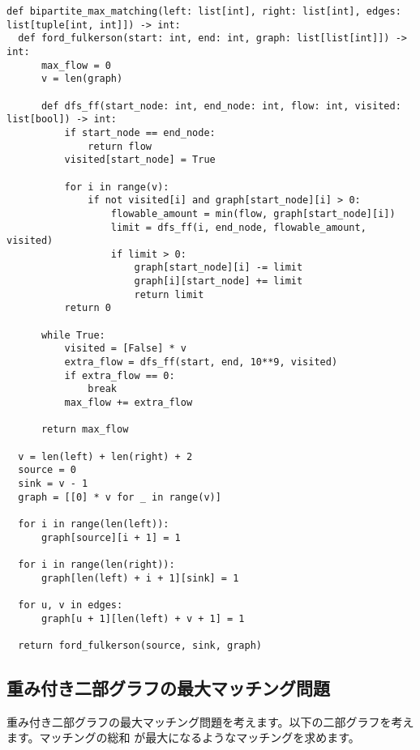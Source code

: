 \documentclass{jlreq}
\begin{document}
\begin{lstlisting}[caption=二部グラフの最大マッチング問題の実装, label=bipartite_matching, frame=TRBL, label={bipartite_matching}]
def bipartite_max_matching(left: list[int], right: list[int], edges: list[tuple[int, int]]) -> int:
  def ford_fulkerson(start: int, end: int, graph: list[list[int]]) -> int:
      max_flow = 0
      v = len(graph)

      def dfs_ff(start_node: int, end_node: int, flow: int, visited: list[bool]) -> int:
          if start_node == end_node:
              return flow
          visited[start_node] = True

          for i in range(v):
              if not visited[i] and graph[start_node][i] > 0:
                  flowable_amount = min(flow, graph[start_node][i])
                  limit = dfs_ff(i, end_node, flowable_amount, visited)
                  if limit > 0:
                      graph[start_node][i] -= limit
                      graph[i][start_node] += limit
                      return limit
          return 0

      while True:
          visited = [False] * v
          extra_flow = dfs_ff(start, end, 10**9, visited)
          if extra_flow == 0:
              break
          max_flow += extra_flow

      return max_flow

  v = len(left) + len(right) + 2  
  source = 0
  sink = v - 1
  graph = [[0] * v for _ in range(v)]

  for i in range(len(left)):
      graph[source][i + 1] = 1  

  for i in range(len(right)):
      graph[len(left) + i + 1][sink] = 1 

  for u, v in edges:
      graph[u + 1][len(left) + v + 1] = 1  

  return ford_fulkerson(source, sink, graph)
\end{lstlisting}

\subsection{重み付き二部グラフの最大マッチング問題}
重み付き二部グラフの最大マッチング問題を考えます。以下の二部グラフを考えます。マッチングの総和
が最大になるようなマッチングを求めます。

\vspace{0.5cm}
\end{document}
